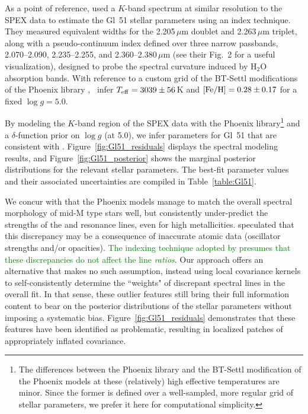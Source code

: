 \documentclass[iop,floatfix]{emulateapj}
\newcommand{\hili}[1]{ \textcolor{green}{#1}}
\begin{document}
As a point of reference, \citet{rojas-ayala12} used a $K$-band spectrum at similar resolution to 
the SPEX data to estimate the Gl~51 stellar parameters using an index technique.  They measured 
equivalent widths for the 2.205\,$\mu$m  doublet and 2.263\,$\mu$m  triplet, 
along with a pseudo-continuum index defined over three narrow passbands, 2.070--2.090, 
2.235--2.255, and 2.360--2.380\,$\mu$m (see their Fig.~2 for a useful visualization), designed to 
probe the spectral curvature induced by H$_2$O absorption bands.  With reference to a custom grid 
of the {\sc BT-Settl} modifications of the {\sc Phoenix} library \citep{allard12}, 
\citeauthor{rojas-ayala12}~infer $T_{\rm eff} = 3039\pm56$\,K and $[{\rm Fe/H}] = 0.28\pm0.17$ for 
a fixed $\log g = 5.0$.  

By modeling the $K$-band region of the SPEX data with the {\sc Phoenix} library\footnote{The 
differences between the \citet{husser13} {\sc Phoenix} library and the {\sc BT-Settl} modification 
of the {\sc Phoenix} models at these (relatively) high effective temperatures are minor.  Since the 
former is defined over a well-sampled, more regular grid of stellar parameters, we prefer it here 
for computational simplicity.} and a $\delta$-function prior on $\log g$ (at 5.0), we infer 
parameters for Gl~51 that are consistent with \citet{rojas-ayala12}.  
Figure~\ref{fig:Gl51_residuals} displays the spectral modeling results, and 
Figure~\ref{fig:Gl51_posterior} shows the marginal posterior distributions for the relevant stellar 
parameters.  The best-fit parameter values and their associated uncertainties are compiled in 
Table~\ref{table:Gl51}.

We concur with \citet{rojas-ayala12} that the {\sc Phoenix} models manage to match the overall 
spectral morphology of mid-M type stars well, but consistently under-predict the strengths of the 
 and  resonance lines, even for high metallicities.  \citet{rajpurohit10} 
speculated that this discrepancy may be a consequence of inaccurate atomic data (oscillator 
strengths and/or opacities).  \hili{The indexing technique adopted by \citeauthor{rojas-ayala12} 
presumes that these discrepancies do not affect the line {\it ratios}}.  Our approach offers an 
alternative that makes no such assumption, instead using local covariance kernels to 
self-consistently determine the ``weights" of discrepant spectral lines in the overall fit.  In 
that sense, these outlier features still bring their full information content to bear on the 
posterior distributions of the stellar parameters without imposing a systematic bias.  
Figure~\ref{fig:Gl51_residuals} demonstrates that these features have been identified as
problematic, resulting in localized patches of appropriately inflated covariance.
\end{document}

